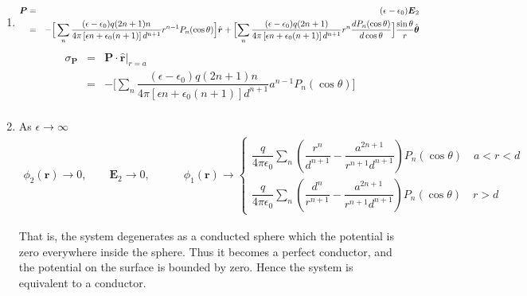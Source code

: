 \documentclass[a4paper,9pt]{article}
\begin{document}
\begin{enumerate}
\begin{enumerate}
    \item
    \begin{eqnarray}
      \boldsymbol{P}
      &=&(\epsilon-\epsilon_0)\boldsymbol{E}_2\nonumber\\
      &=&-\Big[\sum\limits_{n}\dfrac{(\epsilon-\epsilon_0)q(2n+1)n}{4\pi\left[\epsilon n+\epsilon_0(n+1)\right]d^{n+1}}r^{n-1} P_n(\cos\theta)\Big]\hat{\boldsymbol{r}}+\Bigl[\sum\limits_{n}\dfrac{(\epsilon-\epsilon_0)q(2n+1)}{4\pi\left[\epsilon n+\epsilon_0(n+1)\right]d^{n+1}}r^n \dfrac{dP_n(\cos\theta)}{d\cos\theta}\Bigr]\dfrac{\sin\theta}{r}\hat{\boldsymbol{\theta}}\nonumber\\
    \end{eqnarray}
    \begin{eqnarray}
      \sigma_{\boldsymbol{P}}
      &=&\left.\boldsymbol{P}\cdot\hat{\boldsymbol{r}}\right|_{r=a}\nonumber\\
      &=&-\Big[\sum\limits_{n}\dfrac{(\epsilon-\epsilon_0)q(2n+1)n}{4\pi\left[\epsilon n+\epsilon_0(n+1)\right]d^{n+1}}a^{n-1} P_n(\cos\theta)\Big]\nonumber\\
    \end{eqnarray}

    \item As $\epsilon\to\infty$
    \begin{eqnarray}
      \phi_2(\boldsymbol{r})\to 0,\quad\quad \boldsymbol{E}_2\to 0, \quad\quad\quad \phi_1(\boldsymbol{r})\to\begin{cases}
        \dfrac{q}{4\pi\epsilon_0}\sum\limits_{n}(\dfrac{r^n}{d^{n+1}}-\dfrac{a^{2n+1}}{r^{n+1} d^{n+1}})P_n(\cos\theta)\quad a<r<d\\
        \dfrac{q}{4\pi\epsilon_0}\sum\limits_{n}(\dfrac{d^n}{r^{n+1}}-\dfrac{a^{2n+1}}{r^{n+1} d^{n+1}})P_n(\cos\theta)\quad r>d
      \end{cases}
    \end{eqnarray}

    That is, the system degenerates as a conducted sphere which the potential is zero everywhere inside the sphere. Thus it becomes a perfect conductor, and the potential on the surface is bounded by zero. Hence the system is equivalent to a conductor.
  \end{enumerate}
\end{enumerate}
\end{document}

